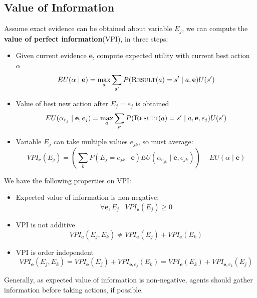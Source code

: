 \documentclass[12pt]{article}
\theoremstyle{definition}
\begin{document}
\subsection{Value of Information}
Assume exact evidence can be obtained about variable $E_j$, we can compute the \textbf{value of perfect information}(VPI), in three steps:
\begin{itemize}
	\item Given current evidence $\mathbf{e}$, compute expected utility with current best action $\alpha$
	\[
EU(\alpha\mid \mathbf{e})=\max_a\sum_{s'} P(\textsc{Result}(a)=s'\mid a, \mathbf{e})U(s')
	\]
	\item Value of best new action after $E_j=e_j$ is obtained
	\[
EU(\alpha_{e_j}\mid \mathbf{e},e_j)=\max_a\sum_{s'}P(\textsc{Result}(a)=s'\mid a, \mathbf{e},e_j)U(s')
	\]
	\item Variable $E_j$ can take multiple values $e_{jk}$, so must average:
	\[
VPI_{\mathbf{e}}(E_j)=(\sum_{k} P(E_j=e_{jk}\mid\mathbf{e})EU(\alpha_{e_{jk}}\mid \mathbf{e},e_{jk}))-EU(\alpha\mid \mathbf{e})
	\]
\end{itemize}
We have the following properties on VPI:
\begin{itemize}
	\item Expected value of information is non-negative:
	\[
\forall \mathbf{e},E_j\;\;\;VPI_\mathbf{e}(E_j)\geq 0
	\]
	\item VPI is not additive
	\[
VPI_\mathbf{e}(E_j,E_k)\neq VPI_\mathbf{e}(E_j)+VPI_\mathbf{e}(E_k)
	\]
	\item VPI is order independent
	\[
VPI_\mathbf{e}(E_j,E_k) = VPI_\mathbf{e}(E_j)+VPI_{\mathbf{e},e_j}(E_k)= VPI_\mathbf{e}(E_k)+VPI_{\mathbf{e},e_k}(E_j)
	\]
\end{itemize}
Generally, as expected value of information is non-negative, agents should gather information before taking actions, if possible.
\clearpage
\end{document}
